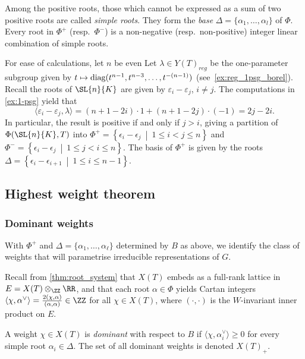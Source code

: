 Among the positive roots, those which cannot be expressed as a sum of two positive roots are called \emph{simple roots}. They form the \emph{base} $\Delta = \{\alpha_1, \ldots, \alpha_l\}$ of $\Phi$. Every root in $\Phi^+$ (resp.\ $\Phi^-$) is a non-negative (resp.\ non-positive) integer linear combination of simple roots.

\begin{exmp}
    For ease of calculations, let $n$ be even Let ${\lambda \in {Y(T)}_{reg}}$ be the one-parameter subgroup given by $t \mapsto \textnormal{diag}(t^{n-1}, t^{n-3}, \ldots, t^{-(n-1)})$ (see~\cref{ex:reg_1psg_borel}). Recall the roots of $\SL{n}{K}$ are given by $\varepsilon_i - \varepsilon_j$, $i \neq j$. The computations in \cref{ex:1-psg} yield that
    \[ \langle \varepsilon_i - \varepsilon_j, \lambda \rangle = (n + 1 - 2i) \cdot 1 + (n + 1 - 2j) \cdot (-1) = 2j - 2i.\]
    In particular, the result is positive if and only if $j > i$, giving a partition of $\Phi(\SL{n}{K}, T)$ into $\Phi^{+} = \left\{\epsilon_i - \epsilon_j ~\middle|~ 1 \leq i < j \leq n \right\}$ and $\Phi^{-} = \left\{\epsilon_i - \epsilon_j ~\middle|~ 1 \leq j < i \leq n\right\}$. The basis of $\Phi^{+}$ is given by the roots $\Delta = \left\{ \epsilon_i - \epsilon_{i+1} ~\middle|~ 1 \leq i \leq n-1 \right\}$.
\end{exmp}


\subsection{Highest weight theorem}

\subsubsection{Dominant weights}

With $\Phi^+$ and $\Delta = \{\alpha_1, \ldots, \alpha_\ell\}$ determined by $B$ as above, we identify the class of weights that will parametrise irreducible representations of $G$.

Recall from \cref{thm:root_system} that $X(T)$ embeds as a full-rank lattice in
$E = X(T) \otimes_\ZZ \RR$, and that each root $\alpha \in \Phi$ yields Cartan integers
$\langle \chi, \alpha^\vee \rangle = \frac{2(\chi, \alpha)}{(\alpha, \alpha)} \in \ZZ$
for all $\chi \in X(T)$, where $(\cdot, \cdot)$ is the $W$-invariant inner product on $E$.

\begin{defn}
    A weight $\chi \in X(T)$ is \emph{dominant} with respect to $B$ if
    $\langle \chi, \alpha_i^\vee \rangle \geq 0$ for every simple root $\alpha_i \in \Delta$. The set of all dominant weights is denoted ${X(T)}_+$.
\end{defn}

